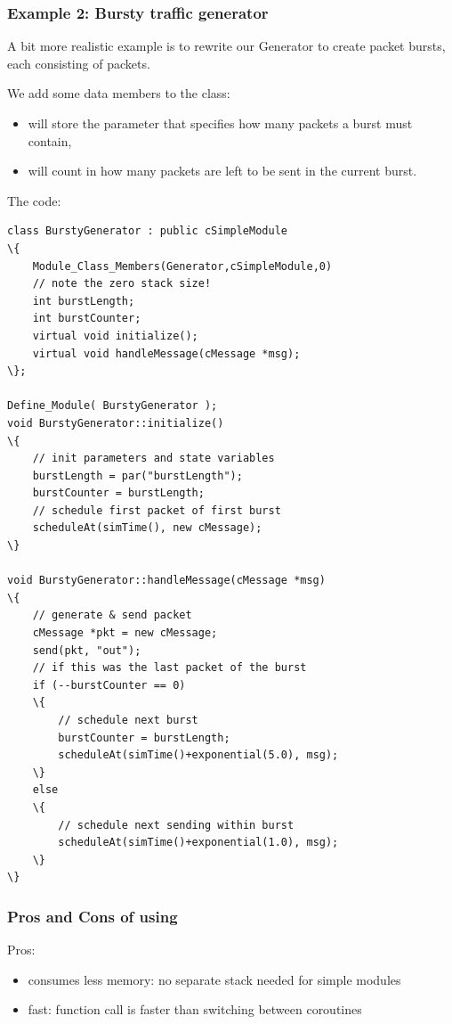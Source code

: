 \subsubsection{Example 2: Bursty traffic generator}


A bit more realistic example is to rewrite our Generator to create
packet bursts, each consisting of  packets.


We add some data members to the class:
\begin{itemize}
\item{ will store the parameter that specifies how many
    packets a burst must contain,}
\item{ will count in how many packets are left to be sent
    in the current burst.}
\end{itemize}

The code:

\begin{Verbatim}[commandchars=\\\{\}]
class BurstyGenerator : public cSimpleModule
\{
    Module_Class_Members(Generator,cSimpleModule,0)
    // note the zero stack size!
    int burstLength;
    int burstCounter;
    virtual void initialize();
    virtual void handleMessage(cMessage *msg);
\};

Define_Module( BurstyGenerator );
void BurstyGenerator::initialize()
\{
    // init parameters and state variables
    burstLength = par("burstLength");
    burstCounter = burstLength;
    // schedule first packet of first burst
    scheduleAt(simTime(), new cMessage);
\}

void BurstyGenerator::handleMessage(cMessage *msg)
\{
    // generate & send packet
    cMessage *pkt = new cMessage;
    send(pkt, "out");
    // if this was the last packet of the burst
    if (--burstCounter == 0)
    \{
        // schedule next burst
        burstCounter = burstLength;
        scheduleAt(simTime()+exponential(5.0), msg);
    \}
    else
    \{
        // schedule next sending within burst
        scheduleAt(simTime()+exponential(1.0), msg);
    \}
\}
\end{Verbatim}



\subsubsection{Pros and Cons of using }


Pros:
\begin{itemize}
  \item{consumes less memory: no separate stack needed for simple modules}
  \item{fast: function call is faster than switching between coroutines}
\end{itemize}

